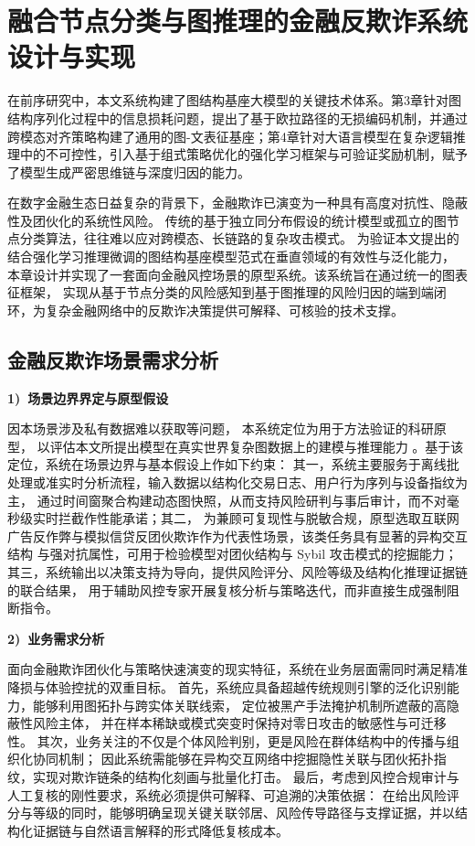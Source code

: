 
\chapter{融合节点分类与图推理的金融反欺诈系统设计与实现}

在前序研究中，本文系统构建了图结构基座大模型的关键技术体系。第3章针对图结构序列化过程中的信息损耗问题，提出了基于欧拉路径的无损编码机制，并通过跨模态对齐策略构建了通用的图-文表征基座；第4章针对大语言模型在复杂逻辑推理中的不可控性，引入基于组式策略优化的强化学习框架与可验证奖励机制，赋予了模型生成严密思维链与深度归因的能力。

在数字金融生态日益复杂的背景下，金融欺诈已演变为一种具有高度对抗性、隐蔽性及团伙化的系统性风险。
传统的基于独立同分布假设的统计模型或孤立的图节点分类算法，往往难以应对跨模态、长链路的复杂攻击模式。
为验证本文提出的结合强化学习推理微调的图结构基座模型范式在垂直领域的有效性与泛化能力，
本章设计并实现了一套面向金融风控场景的原型系统。该系统旨在通过统一的图表征框架，
实现从基于节点分类的风险感知到基于图推理的风险归因的端到端闭环，为复杂金融网络中的反欺诈决策提供可解释、可核验的技术支撑。

\section{金融反欺诈场景需求分析}

\textbf{1)\ 场景边界界定与原型假设}

因本场景涉及私有数据难以获取等问题，
本系统定位为用于方法验证的科研原型，
以评估本文所提出模型在真实世界复杂图数据上的建模与推理能力
。基于该定位，系统在场景边界与基本假设上作如下约束：
其一，系统主要服务于离线批处理或准实时分析流程，输入数据以结构化交易日志、用户行为序列与设备指纹为主，
通过时间窗聚合构建动态图快照，从而支持风险研判与事后审计，而不对毫秒级实时拦截作性能承诺；其二，
为兼顾可复现性与脱敏合规，原型选取互联网广告反作弊与模拟信贷反团伙欺诈作为代表性场景，该类任务具有显著的异构交互结构
与强对抗属性，可用于检验模型对团伙结构与 Sybil 攻击模式的挖掘能力；
其三，系统输出以决策支持为导向，提供风险评分、风险等级及结构化推理证据链的联合结果，
用于辅助风控专家开展复核分析与策略迭代，而非直接生成强制阻断指令。


\textbf{2)\ 业务需求分析}

面向金融欺诈团伙化与策略快速演变的现实特征，系统在业务层面需同时满足精准降损与体验控扰的双重目标。
首先，系统应具备超越传统规则引擎的泛化识别能力，能够利用图拓扑与跨实体关联线索，
定位被黑产手法掩护机制所遮蔽的高隐蔽性风险主体，
并在样本稀缺或模式突变时保持对零日攻击的敏感性与可迁移性。
其次，业务关注的不仅是个体风险判别，更是风险在群体结构中的传播与组织化协同机制；
因此系统需能够在异构交互网络中挖掘隐性关联与团伙拓扑指纹，实现对欺诈链条的结构化刻画与批量化打击。
最后，考虑到风控合规审计与人工复核的刚性要求，系统必须提供可解释、可追溯的决策依据：
在给出风险评分与等级的同时，能够明确呈现关键关联邻居、风险传导路径与支撑证据，并以结构化证据链与自然语言解释的形式降低复核成本。

